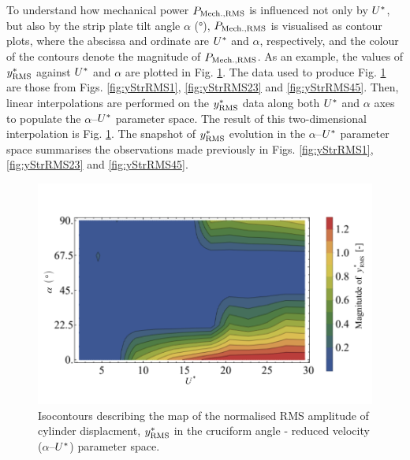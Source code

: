 \documentclass[oneside]{utmthesis}
\begin{document}
To understand how mechanical power $P_{\text{Mech.,RMS}}$ is influenced not only by $U^{*}$, but also by the strip plate tilt angle $\alpha$ (\si{\degree}), $P_{\text{Mech.,RMS}}$ is visualised as contour plots, where the abscissa and ordinate are $U^{*}$ and $\alpha$, respectively, and the colour of the contours denote the magnitude of $P_{\text{Mech.,RMS}}$. As an example, the values of $y^{*}_{\text{RMS}}$ against $U^{*}$ and $\alpha$ are plotted in Fig. \ref{fig:yRMSContour}. The data used to produce Fig. \ref{fig:yRMSContour} are those from Figs. \ref{fig:yStrRMS1}, \ref{fig:yStrRMS23} and \ref{fig:yStrRMS45}. Then, linear interpolations are performed on the $y^{*}_{\text{RMS}}$ data along both $U^{*}$ and $\alpha$ axes to populate the $\alpha$--$U^{*}$ parameter space. The result of this two-dimensional interpolation is Fig. \ref{fig:yRMSContour}. The snapshot of $y^{*}_{\text{RMS}}$ evolution in the $\alpha$--$U^{*}$ parameter space summarises the observations made previously in Figs. \ref{fig:yStrRMS1}, \ref{fig:yStrRMS23} and \ref{fig:yStrRMS45}.

\begin{figure}
  \centering
  \includegraphics[width=1\textwidth]{figs/yRMSContour}
  \caption{Isocontours describing the map of the normalised RMS amplitude of cylinder displacment, $y^{*}_{\text{RMS}}$ in the cruciform angle - reduced velocity ($\alpha$--$U^{*}$) parameter space.}
  \label{fig:yRMSContour}
\end{figure}
\end{document}
